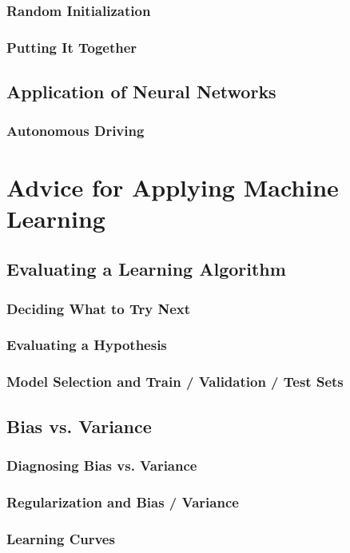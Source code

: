 \documentclass{article}
\begin{document}
\subsubsection{Random Initialization}
\subsubsection{Putting It Together}
\subsection{Application of Neural Networks}
\subsubsection{Autonomous Driving}

\newpage

\section{Advice for Applying Machine Learning}
\subsection{Evaluating a Learning Algorithm}
\subsubsection{Deciding What to Try Next}
\subsubsection{Evaluating a Hypothesis}
\subsubsection{Model Selection and Train / Validation / Test Sets}
\subsection{Bias vs. Variance}
\subsubsection{Diagnosing Bias vs. Variance}
\subsubsection{Regularization and Bias / Variance}
\subsubsection{Learning Curves}
\end{document}
